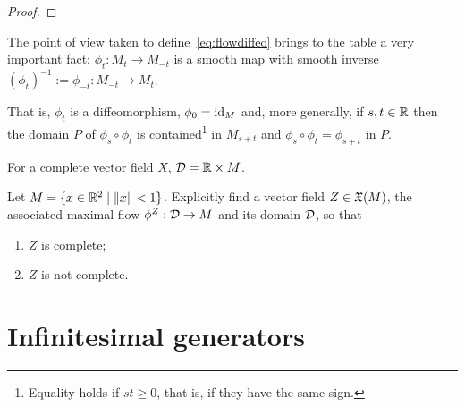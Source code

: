 \begin{proof}

\end{proof}

\begin{remark}\label{rmk:automorphismgroup}
	The point of view taken to define~\eqref{eq:flowdiffeo} brings to the table a very important fact: $\phi_t : M_t \to M_{-t}$ is a smooth map with smooth inverse $(\phi_t)^{-1}:=\phi_{-t}: M_{-t} \to M_t$.

	That is, $\phi_t$ is a diffeomorphism, $\phi_0 = \operatorname{id}_M$ and, more generally, if $s,t \in \mathbb{R}$ then the domain $P$ of $\phi_s \circ \phi_t$ is contained\footnote{Equality holds if $st \geq 0$, that is, if they have the same sign.} in $M_{s+t}$ and $\phi_s \circ \phi_t = \phi_{s+t}$ in $P$.
\end{remark}

For a complete vector field $X$, $\mathcal{D} = \mathbb{R}\times M$.

\begin{exercise}
	Let $M = \{x\in\mathbb{R}^2 \mid \|x\|<1\}$. Explicitly find a vector field $Z\in\mathfrak{X}(M)$, the associated maximal flow $\phi^Z: \mathcal{D} \to M$ and its domain $\mathcal{D}$, so that
	\begin{enumerate}
		\item $Z$ is complete;
		\item $Z$ is not complete.
	\end{enumerate}
\end{exercise}

\section{Infinitesimal generators}

